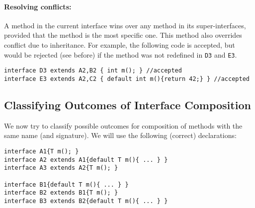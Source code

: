 \paragraph{Resolving conflicts:}
A method in the current interface wins over any method in its
super-interfaces, provided that the method
is the most specific one. This method also overrides conflict due to
inheritance. For example, the following code is accepted, but would be rejected
(see before) if the method \Q@m@ was not redefined in \texttt{D3} and
\texttt{E3}.
\begin{lstlisting}
interface D3 extends A2,B2 { int m(); } //accepted
interface E3 extends A2,C2 { default int m(){return 42;} } //accepted
\end{lstlisting}

\subsection{Classifying Outcomes of Interface Composition}
%
We now try to classify possible outcomes for composition of methods with the same name (and
signature).
We will use the following (correct) declarations:
\begin{lstlisting}
interface A1{T m(); }
interface A2 extends A1{default T m(){ ... } }
interface A3 extends A2{T m(); }

interface B1{default T m(){ ... } }
interface B2 extends B1{T m(); }
interface B3 extends B2{default T m(){ ... } }
\end{lstlisting}

